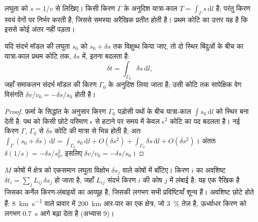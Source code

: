 लघुता को $s = 1/v$ से लिखिए। किसी किरण $\Gamma$ के अनुदिश यात्रा-काल
$T = \int_\Gamma s\,\mathrm dl$ है; परंतु किरण स्वयं वेगों पर निर्भर करती है,
जिससे समस्या अरैखिक प्रतीत होती है। प्रथम कोटि का उत्तर यह है कि
इससे कोई अंतर नहीं पड़ता।

\begin{proposition}[रैखिकीकृत यात्रा-काल अवशिष्ट]\label{prop:b3:seismology-imaging:linear}
यदि संदर्भ मॉडल की लघुता $s_0$ को $s_0 + \delta s$ तक विक्षुब्ध किया जाए,
तो दो स्थिर बिंदुओं के बीच का यात्रा-काल प्रथम कोटि तक,
$\delta s$ में, इतना बदलता है:
\[
  \delta t = \int_{\Gamma_0}\delta s\,\mathrm dl ,
\]
जहाँ समाकलन संदर्भ मॉडल की किरण $\Gamma_0$ के अनुदिश लिया जाता है; उसी कोटि तक
सापेक्षिक वेग विसंगति $\delta v/v_0 = -\delta s/s_0$ होती है।
\end{proposition}

\begin{proof}
फ़र्मा के सिद्धांत के अनुसार किरण $\Gamma_0$ पड़ोसी पथों के बीच यात्रा-काल
$\int s_0\,\mathrm dl$ को स्थिर बना देती है: पथ को किसी छोटे परिमाण $\epsilon$ से
हटाने पर समय में केवल $\epsilon^2$ कोटि का पद बदलता है।
नई किरण $\Gamma$, $\Gamma_0$ से $\delta s$ कोटि की मात्रा से भिन्न होती है;
अतः $\int_\Gamma(s_0 + \delta s)\,\mathrm dl = \int_{\Gamma_0}s_0\,\mathrm dl +
O(\delta s^2) + \int_{\Gamma_0}\delta s\,\mathrm dl + O(\delta s^2)$। अंततः
$\delta(1/s) = -\delta s/s_0^2$, इसलिए $\delta v/v_0 = -\delta s/s_0$।
\end{proof}

$M$ कोषों में क्षेत्र को एकसमान लघुता विक्षोभ $\delta s_j$ वाले कोषों में बाँटिए।
किरण $i$ का अवशिष्ट $\delta t_i = \sum_j L_{ij}\,\delta s_j$ हो जाता है, जहाँ
$L_{ij}$ संदर्भ किरण $i$ की कोष $j$ में लंबाई है: यह एक रैखिक  है
जिसका कर्नेल किरण-लंबाइयों का आव्यूह है, जिसकी लगभग सभी प्रविष्टियाँ शून्य हैं।
अवशिष्ट छोटे होते हैं: \qty{8}{km.s^{-1}} वाले प्रावार में \qty{200}{km} आर-पार का
एक क्षेत्र, जो \qty{3}{\percent} तेज़ है, ऊर्ध्वाधर किरण को लगभग \qty{0.7}{s} आगे
बढ़ा देता है (अभ्यास 9)।


